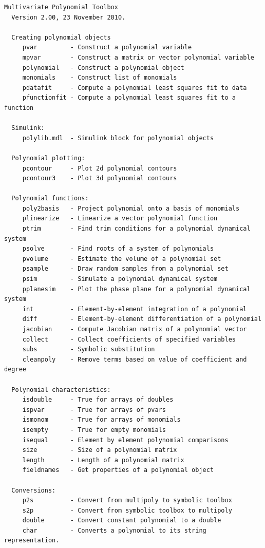 \documentclass{article}
\begin{document}
\begin{verbatim}
Multivariate Polynomial Toolbox
  Version 2.00, 23 November 2010.

  Creating polynomial objects
     pvar         - Construct a polynomial variable
     mpvar        - Construct a matrix or vector polynomial variable
     polynomial   - Construct a polynomial object
     monomials    - Construct list of monomials
     pdatafit     - Compute a polynomial least squares fit to data
     pfunctionfit - Compute a polynomial least squares fit to a function

  Simulink:
     polylib.mdl  - Simulink block for polynomial objects

  Polynomial plotting:
     pcontour     - Plot 2d polynomial contours
     pcontour3    - Plot 3d polynomial contours

  Polynomial functions:
     poly2basis   - Project polynomial onto a basis of monomials
     plinearize   - Linearize a vector polynomial function
     ptrim        - Find trim conditions for a polynomial dynamical system
     psolve       - Find roots of a system of polynomials
     pvolume      - Estimate the volume of a polynomial set
     psample      - Draw random samples from a polynomial set
     psim         - Simulate a polynomial dynamical system
     pplanesim    - Plot the phase plane for a polynomial dynamical system
     int          - Element-by-element integration of a polynomial
     diff         - Element-by-element differentiation of a polynomial
     jacobian     - Compute Jacobian matrix of a polynomial vector
     collect      - Collect coefficients of specified variables
     subs         - Symbolic substitution
     cleanpoly    - Remove terms based on value of coefficient and degree

  Polynomial characteristics:
     isdouble     - True for arrays of doubles
     ispvar       - True for arrays of pvars
     ismonom      - True for arrays of monomials
     isempty      - True for empty monomials
     isequal      - Element by element polynomial comparisons
     size         - Size of a polynomial matrix
     length       - Length of a polynomial matrix
     fieldnames   - Get properties of a polynomial object

  Conversions:
     p2s          - Convert from multipoly to symbolic toolbox
     s2p          - Convert from symbolic toolbox to multipoly
     double       - Convert constant polynomial to a double
     char         - Converts a polynomial to its string representation.


\end{verbatim}
\end{document}
